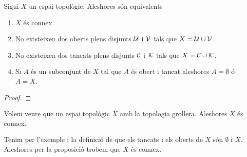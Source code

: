 \documentclass[../Apunts.tex]{subfiles}
\begin{document}
	\begin{proposition}
		\label{prop:condicions equivalents a espai connex}
		Sigui \(X\) un espai topològic. Aleshores són equivalents
		\begin{enumerate}
			\item\label{prop:condicions equivalents a espai connex:eq1} \(X\) és connex.
			\item\label{prop:condicions equivalents a espai connex:eq2} No existeixen dos oberts plens disjunts \(\mathcal{U}\) i \(\mathcal{V}\) tals que \(X=\mathcal{U}\cup\mathcal{V}\).
			\item\label{prop:condicions equivalents a espai connex:eq3} No existeixen dos tancats plens disjunts \(\mathcal{C}\) i \(\mathcal{K}\) tals que \(X=\mathcal{C}\cup\mathcal{K}\).
			\item\label{prop:condicions equivalents a espai connex:eq4} Si \(A\) és un subconjunt de \(X\) tal que \(A\) és obert i tancat aleshores \(A=\emptyset\) ó \(A=X\).
		\end{enumerate}
		\begin{proof}
		\end{proof}
	\end{proposition}
	\begin{example}
		\label{ex:l'espai amb la topologia grollera és connex}
		Volem veure que un espai topològic \(X\) amb la topologia grollera. Aleshores \(X\) és connex.
		\begin{solution}
			Tenim per l'exemple  i la definició de  que els tancats i els oberts de \(X\) són \(\emptyset\) i \(X\). Aleshores per la proposició  trobem que \(X\) és connex.
		\end{solution}
	\end{example}
\end{document}
